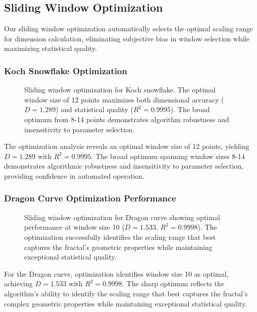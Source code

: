 \documentclass[preprint,12pt]{elsarticle}
\begin{document}
\subsection{Sliding Window Optimization}

Our sliding window optimization automatically selects the optimal scaling range for dimension calculation, eliminating subjective bias in window selection while maximizing statistical quality.

\subsubsection{Koch Snowflake Optimization}

\begin{figure}[ht]
\centering
\caption{Sliding window optimization for Koch snowflake. The optimal window size of 12 points maximizes both dimensional accuracy ($D = 1.289$) and statistical quality ($R^2 = 0.9995$). The broad optimum from 8-14 points demonstrates algorithm robustness and insensitivity to parameter selection.}
\label{fig:koch_optimization}
\end{figure}

The optimization analysis reveals an optimal window size of 12 points, yielding $D = 1.289$ with $R^2 = 0.9995$. The broad optimum spanning window sizes 8-14 demonstrates algorithmic robustness and insensitivity to parameter selection, providing confidence in automated operation.

\subsubsection{Dragon Curve Optimization Performance}

\begin{figure}[ht]
\centering
\caption{Sliding window optimization for Dragon curve showing optimal performance at window size 10 ($D = 1.533$, $R^2 = 0.9998$). The optimization successfully identifies the scaling range that best captures the fractal's geometric properties while maintaining exceptional statistical quality.}
\label{fig:dragon_optimization}
\end{figure}

For the Dragon curve, optimization identifies window size 10 as optimal, achieving $D = 1.533$ with $R^2 = 0.9998$. The sharp optimum reflects the algorithm's ability to identify the scaling range that best captures the fractal's complex geometric properties while maintaining exceptional statistical quality.
\end{document}

